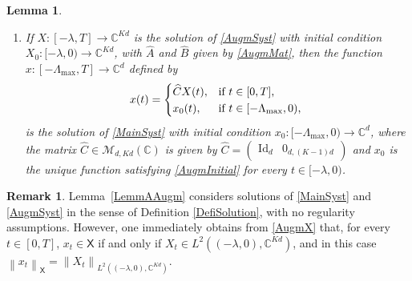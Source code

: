 \documentclass[JEP,XML,SOM,Unicode]{cedram}
\newcommand{\llbracket}{[\![}
\newcommand{\rrbracket}{]\!]}
\theoremstyle{plain}
\newtheorem{lemm}[theo]{Lemma}
\theoremstyle{definition}
\newtheorem{remk}[theo]{Remark}
\DeclareMathOperator{\id}{Id}
\newcommand{\norm}[1]{\left\lVert #1\right\lVert}
\begin{document}
\begin{lemm}
\begin{enumerate}
\begin{equation}
\begin{aligned}
&\hspace*{2cm}\text{(in particular, $\widehat A_k = 0$ if $k_j \neq k$ for all $j \in \llbracket 1, N\rrbracket$)},
\end{aligned}
\end{equation}
and with initial condition $X_0: [-\lambda, 0) \to \mathbb C^{K d}$ given by
\begin{equation}
\label{AugmInitial}
X_0(t) = \begin{pmatrix}
x_0(t) \\
x_0(t - \lambda) \\
x_0(t - 2\lambda) \\
\vdots \\
x_0(t - (K-1)\lambda) \\
\end{pmatrix}.
\end{equation}

\item If $X: [-\lambda, T] \to \mathbb C^{K d}$ is the solution of \eqref{AugmSyst} with initial condition $X_0: [-\lambda, 0) \to \mathbb C^{K d}$, with $\widehat A$ and $\widehat B$ given by \eqref{AugmMat}, then the function $x: [-\Lambda_{\max}, T] \to \mathbb C^d$ defined by
\[
x(t) =
\begin{dcases*}
\widehat C X(t), & if $t \in [0, T]$, \\
x_0(t), & if $t \in [-\Lambda_{\max}, 0)$,
\end{dcases*}
\]
is the solution of \eqref{MainSyst} with initial condition $x_0: [-\Lambda_{\max}, 0) \to \mathbb C^d$, where the matrix $\widehat C \in \mathcal M_{d, K d}(\mathbb C)$ is given by $\widehat C = \begin{pmatrix}\id_d & 0_{d, (K-1)d}\end{pmatrix}$ and $x_0$ is the unique function satisfying \eqref{AugmInitial} for every $t \in [-\lambda, 0)$.
\end{enumerate}
\end{lemm}

\begin{remk}
Lemma~\ref{LemmAAugm} considers solutions of \eqref{MainSyst} and \eqref{AugmSyst} in the sense of Definition \ref{DefiSolution}, \ie with no regularity assumptions. However, one immediately obtains from \eqref{AugmX} that, for every $t \in [0, T]$, $x_t \in \mathsf X$ if and only if $X_t \in L^2((-\lambda, 0), \mathbb C^{Kd})$, and in this case $\norm{x_t}_{\mathsf X} = \norm{X_t}_{L^2((-\lambda, 0), \mathbb C^{Kd})}$.
\end{remk}
\end{document}
